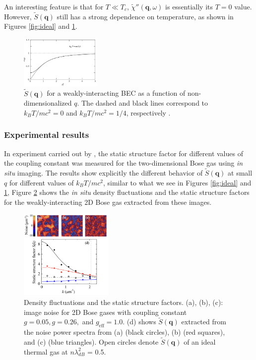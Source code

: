 \documentclass[reprint,
nofootinbib,
amsmath,amssymb,
aps]{revtex4-1}
\begin{document}
An interesting feature is that for $T \ll T_c$, $\widetilde{\chi}''(\mathbf{q},\omega)$ is essentially its $T=0$ value. However, $\widetilde{S}(\mathbf{q})$ still has a strong dependence on temperature, as shown in Figures \ref{fig:ideal} and \ref{fig:interacting}. 

\begin{figure}[!htb]
\label{fig:interacting}
\centering
\includegraphics[width=0.35\textwidth]{figures/interacting.png}
\caption{$\widetilde{S}(\mathbf{q})$ for a weakly-interacting BEC as a function of non-dimensionalized $q$. The dashed and black lines correspond to $k_BT/mc^2=0$ and $k_BT/mc^2 = 1/4$, respectively \cite{pitaevskii2016bose}.}
\end{figure}






\subsubsection{Experimental results}

In experiment carried out by \cite{hung2011extracting}, the static structure factor for different values of the coupling constant was measured for the two-dimensional Bose gas using \textit{in situ} imaging. The results show explicitly the different behavior of $\widetilde{S}(\mathbf{q})$ at small $q$ for different values of $k_BT / mc^2$, similar to what we see in Figures \ref{fig:ideal} and \ref{fig:interacting}, Figure \ref{fig:hung2011} shows the \textit{in situ} density fluctuations and the static structure factors for the weakly-interacting 2D Bose gas extracted from these images. 
\begin{figure}[!htb]
\label{fig:hung2011}
\centering
\includegraphics[width=0.4\textwidth]{figures/hung2011.png}
\caption{Density fluctuations and the static structure factors. (a), (b), (c): image noise for 2D Bose gases with coupling constant $g = 0.05, g = 0.26,$ and $g_\text{eff} = 1.0$. (d) shows $\widetilde{S}(\mathbf{q})$ extracted from the noise power spectra from (a) (black circles), (b) (red squares), and (c) (blue triangles). Open circles denote $\widetilde{S}(\mathbf{q})$ of an ideal thermal gas at $n\lambda_{dB}^2$ = 0.5. }
\end{figure}
\end{document}
